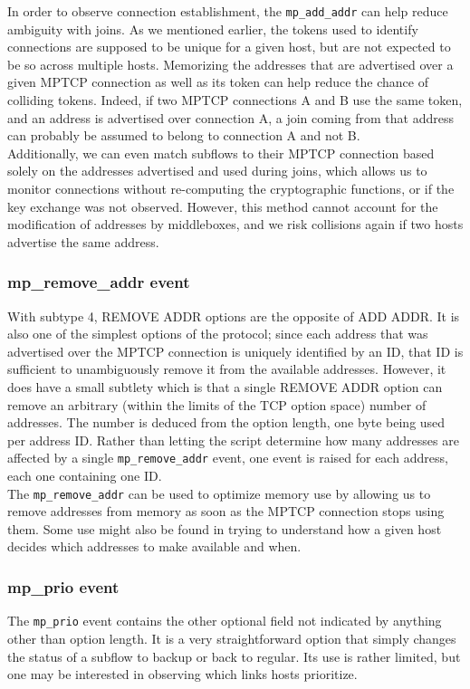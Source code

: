 \documentclass[12pt, a4paper, oneside]{article} %
\begin{document}
In order to observe connection establishment, the \texttt{mp\_add\_addr} can help reduce ambiguity with joins. As we mentioned earlier, the tokens used to identify connections are supposed to be unique for a given host, but are not expected to be so across multiple hosts. Memorizing the addresses that are advertised over a given MPTCP connection as well as its token can help reduce the chance of colliding tokens. Indeed, if two MPTCP connections A and B use the same token, and an address is advertised over connection A, a join coming from that address can probably be assumed to belong to connection A and not B. \\

Additionally, we can even match subflows to their MPTCP connection based solely on the addresses advertised and used during joins, which allows us to monitor connections without re-computing the cryptographic functions, or if the key exchange was not observed. However, this method cannot account for the modification of addresses by middleboxes, and we risk collisions again if two hosts advertise the same address.

\subsubsection{mp\_remove\_addr event}
With subtype 4, REMOVE ADDR options are the opposite of ADD ADDR. It is also one of the simplest options of the protocol; since each address that was advertised over the MPTCP connection is uniquely identified by an ID, that ID is sufficient to unambiguously remove it from the available addresses. However, it does have a small subtlety which is that a single REMOVE ADDR option can remove an arbitrary (within the limits of the TCP option space) number of addresses. The number is deduced from the option length, one byte being used per address ID. Rather than letting the script determine how many addresses are affected by a single \texttt{mp\_remove\_addr} event, one event is raised for each address, each one containing one ID. \\

The \texttt{mp\_remove\_addr} can be used to optimize memory use by allowing us to remove addresses from memory as soon as the MPTCP connection stops using them. Some use might also be found in trying to understand how a given host decides which addresses to make available and when.

\subsubsection{mp\_prio event}
The \texttt{mp\_prio} event contains the other optional field not indicated by anything other than option length. It is a very straightforward option that simply changes the status of a subflow to backup or back to regular. Its use is rather limited, but one may be interested in observing which links hosts prioritize.
\end{document}
